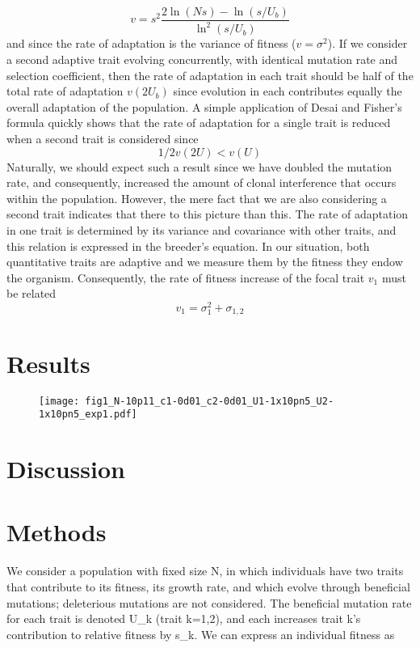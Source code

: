 \documentclass{article}
\begin{document}
\begin{equation} 
v =s^2  \frac{2 \ln(Ns)-\ln(s/U_b)}{\ln^2(s/U_b)}
\end{equation}  
and since the rate of adaptation is the variance of fitness ($v=\sigma^2$).  If we consider a second adaptive trait evolving concurrently, with identical mutation rate and selection coefficient, then the rate of adaptation in each trait should be half of the total rate of adaptation $v(2U_b)$ since evolution in each contributes equally the overall adaptation of the population. A simple application of Desai and Fisher’s formula quickly shows that the rate of adaptation for a single trait is reduced when a second trait is considered since
\[ 1/2  v(2U)<v(U) \]
Naturally, we should expect such a result since we have doubled the mutation rate, and consequently, increased the amount of clonal interference that occurs within the population. However, the mere fact that we are also considering a second trait indicates that there to this picture than this.
The rate of adaptation in one trait is determined by its variance and covariance with other traits, and this relation is expressed in the breeder’s equation. In our situation, both quantitative traits are adaptive and we measure them by the fitness they endow the organism. Consequently, the rate of fitness increase of the focal trait $v_1$ must be related
\begin{equation}
v_1=\sigma_1^2+\sigma_{1,2}
\end{equation}


\section*{Results}

\begin{figure}
\texttt{[image: fig1\_N-10p11\_c1-0d01\_c2-0d01\_U1-1x10pn5\_U2-1x10pn5\_exp1.pdf]}
\end{figure}
\section*{Discussion}

\section*{Methods}
We consider a population with fixed size N, in which individuals have two traits that contribute to its fitness, its growth rate, and which evolve through beneficial mutations; deleterious mutations are not considered.  The beneficial mutation rate for each trait is denoted U_k (trait k=1,2), and each increases trait k’s contribution to relative fitness by s_k.  We can express an individual fitness as 
\end{document}
